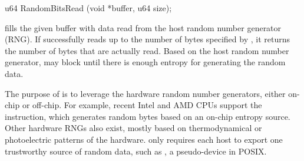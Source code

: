 \begin{paldef}
u64 RandomBitsRead (void *buffer, u64 size);
\end{paldef}


 fills the given buffer with data read from the host random number generator (RNG).
If  successfully reads up to the number of bytes
specified by , it returns the number of bytes that are actually read.
Based on the host random number generator,
 may block until there is enough entropy for generating the random data.


The purpose of  is to leverage the hardware random number generators,
either on-chip or off-chip.
For example, recent Intel and AMD CPUs support the  instruction,
which generates random bytes based on an on-chip entropy source.
Other hardware RNGs also exist, mostly based on thermodynamical or photoelectric patterns of the hardware.
\graphene{} only requires each host to export
one trustworthy source of random data,
such as , a pseudo-device in POSIX.




%
%
%
